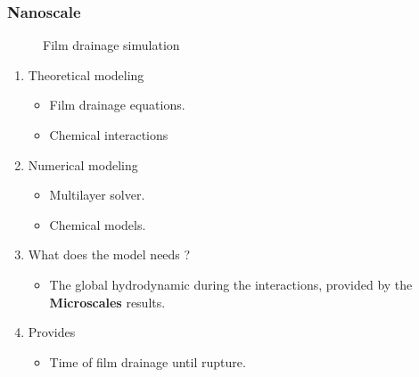 \documentclass{sintefbeamer}
\begin{document}
\begin{frame}
  \frametitle{Nanoscale}

  \begin{figure}
    \caption{Film drainage simulation}
  \end{figure}

  \begin{enumerate}
    \item Theoretical modeling 
    \begin{itemize}
      \item Film drainage equations.
      \item Chemical interactions
    \end{itemize}
    \item Numerical modeling 
    \begin{itemize}
      \item Multilayer solver. 
      \item Chemical models. 
    \end{itemize}
    \item What does the model needs ? 
    \begin{itemize}
      \item The global hydrodynamic during the interactions, provided by the \textbf{Microscales} results.  
    \end{itemize}
    \item Provides 
    \begin{itemize}
      \item Time of film drainage until rupture.  
	    \end{itemize}
  \end{enumerate}
\end{frame}
\end{document}
